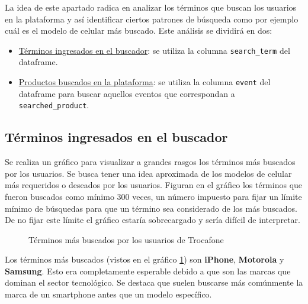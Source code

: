 \documentclass[a4paper]{article}
\begin{document}
La idea de este apartado radica en analizar los términos que buscan los usuarios en la plataforma y así identificar ciertos patrones de búsqueda como por ejemplo cuál es el modelo de celular más buscado. Este análisis se dividirá en dos:

\begin{itemize}
	\item \underline{Términos ingresados en el buscador}: se utiliza la columna \texttt{search\_term} del dataframe.
	\item \underline{Productos buscados en la plataforma}: se utiliza la columna \texttt{event} del dataframe para buscar aquellos eventos que correspondan a \texttt{searched\_product}.
 \end{itemize}

\subsection{Términos ingresados en el buscador}

Se realiza un gráfico para visualizar a grandes rasgos los términos más buscados por los usuarios. Se busca tener una idea aproximada de los modelos de celular más requeridos o deseados por los usuarios. Figuran en el gráfico los términos que fueron buscados como mínimo 300 veces, un número impuesto para fijar un límite mínimo de búsquedas para que un término sea considerado de los más buscados. De no fijar este límite el gráfico estaría sobrecargado y sería difícil de interpretar.

\begin{figure}[h!]
	\caption{Términos más buscados por los usuarios de Trocafone}
	\label{fig:searchedterm}
\end{figure}

Los términos más buscados (vistos en el gráfico \ref{fig:searchedterm}) son \textbf{iPhone}, \textbf{Motorola} y \textbf{Samsung}. Esto era completamente esperable debido a que son las marcas que dominan el sector tecnológico. Se destaca que suelen buscarse más comúnmente la marca de un smartphone antes que un modelo específico.
\end{document}
